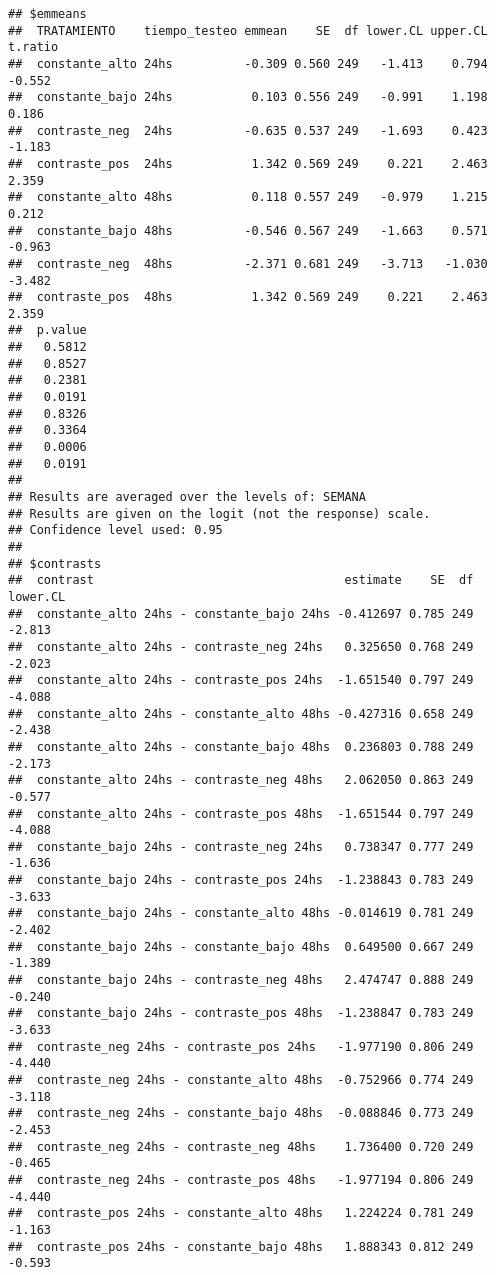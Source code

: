 \documentclass[
]{article}
\begin{document}
\begin{verbatim}
## $emmeans
##  TRATAMIENTO    tiempo_testeo emmean    SE  df lower.CL upper.CL t.ratio
##  constante_alto 24hs          -0.309 0.560 249   -1.413    0.794  -0.552
##  constante_bajo 24hs           0.103 0.556 249   -0.991    1.198   0.186
##  contraste_neg  24hs          -0.635 0.537 249   -1.693    0.423  -1.183
##  contraste_pos  24hs           1.342 0.569 249    0.221    2.463   2.359
##  constante_alto 48hs           0.118 0.557 249   -0.979    1.215   0.212
##  constante_bajo 48hs          -0.546 0.567 249   -1.663    0.571  -0.963
##  contraste_neg  48hs          -2.371 0.681 249   -3.713   -1.030  -3.482
##  contraste_pos  48hs           1.342 0.569 249    0.221    2.463   2.359
##  p.value
##   0.5812
##   0.8527
##   0.2381
##   0.0191
##   0.8326
##   0.3364
##   0.0006
##   0.0191
## 
## Results are averaged over the levels of: SEMANA 
## Results are given on the logit (not the response) scale. 
## Confidence level used: 0.95 
## 
## $contrasts
##  contrast                                   estimate    SE  df lower.CL
##  constante_alto 24hs - constante_bajo 24hs -0.412697 0.785 249   -2.813
##  constante_alto 24hs - contraste_neg 24hs   0.325650 0.768 249   -2.023
##  constante_alto 24hs - contraste_pos 24hs  -1.651540 0.797 249   -4.088
##  constante_alto 24hs - constante_alto 48hs -0.427316 0.658 249   -2.438
##  constante_alto 24hs - constante_bajo 48hs  0.236803 0.788 249   -2.173
##  constante_alto 24hs - contraste_neg 48hs   2.062050 0.863 249   -0.577
##  constante_alto 24hs - contraste_pos 48hs  -1.651544 0.797 249   -4.088
##  constante_bajo 24hs - contraste_neg 24hs   0.738347 0.777 249   -1.636
##  constante_bajo 24hs - contraste_pos 24hs  -1.238843 0.783 249   -3.633
##  constante_bajo 24hs - constante_alto 48hs -0.014619 0.781 249   -2.402
##  constante_bajo 24hs - constante_bajo 48hs  0.649500 0.667 249   -1.389
##  constante_bajo 24hs - contraste_neg 48hs   2.474747 0.888 249   -0.240
##  constante_bajo 24hs - contraste_pos 48hs  -1.238847 0.783 249   -3.633
##  contraste_neg 24hs - contraste_pos 24hs   -1.977190 0.806 249   -4.440
##  contraste_neg 24hs - constante_alto 48hs  -0.752966 0.774 249   -3.118
##  contraste_neg 24hs - constante_bajo 48hs  -0.088846 0.773 249   -2.453
##  contraste_neg 24hs - contraste_neg 48hs    1.736400 0.720 249   -0.465
##  contraste_neg 24hs - contraste_pos 48hs   -1.977194 0.806 249   -4.440
##  contraste_pos 24hs - constante_alto 48hs   1.224224 0.781 249   -1.163
##  contraste_pos 24hs - constante_bajo 48hs   1.888343 0.812 249   -0.593

\end{verbatim}
\end{document}
